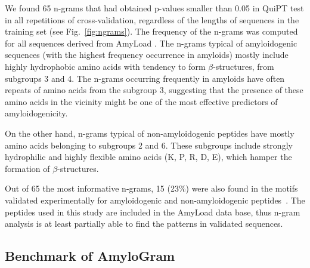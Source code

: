 \documentclass[fleqn,10pt,twoside]{gcb15submission}
\begin{document}
  We found 65 n-grams that had  obtained p-values smaller than 0.05 in QuiPT 
test in all repetitions of cross-validation, regardless of the lengths of 
sequences in the training set (see Fig.~\ref{fig:ngrams}). The frequency of the 
n-grams was computed for all sequences derived from AmyLoad . The n-grams 
typical of amyloidogenic sequences (with the highest frequency occurrence in 
amyloids) mostly include highly hydrophobic amino acids with tendency to form 
$\beta$-structures, from subgroups 3 and 4. The n-grams occurring frequently in 
amyloids have often repeats of amino acids from the subgroup 3, suggesting that 
the presence of these amino acids in the vicinity might be one of the most 
effective predictors of amyloidogenicity.

  On the other hand, n-grams typical of non-amyloidogenic peptides have mostly 
amino acids belonging to subgroups 2 and 6. These subgroups include strongly 
hydrophilic and highly flexible amino acids (K, P, R, D, E), which hamper the 
formation of $\beta$-structures.

  Out of 65 the most informative n-grams, 15 (23\%) were also found in the motifs 
validated experimentally for amyloidogenic and non-amyloidogenic 
peptides~\citep{lopez_de_la_paz_sequence_2004}. The peptides used in this study are 
included in the AmyLoad data base, thus n-gram analysis is at least 
partially able to find the patterns in validated sequences.

\subsection{Benchmark of AmyloGram}
\end{document}
